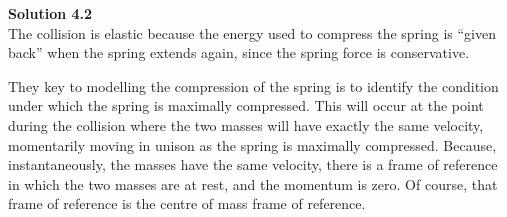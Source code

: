 \documentclass[9pt,arxiv,red]{lapreprint}
\begin{document}
\begin{framed}
\textbf{Solution 4.2}\\
The collision is elastic because the energy used to compress the spring is ``given back'' when the spring extends again, since the spring force is conservative.

They key to modelling the compression of the spring is to identify the condition under which the spring is maximally compressed. This will occur at the point during the collision where the two masses will have exactly the same velocity, momentarily moving in unison as the spring is maximally compressed. Because, instantaneously, the masses have the same velocity, there is a frame of reference in which the two masses are at rest, and the momentum is zero. Of course, that frame of reference is the centre of mass frame of reference.


\end{framed}
\end{document}
